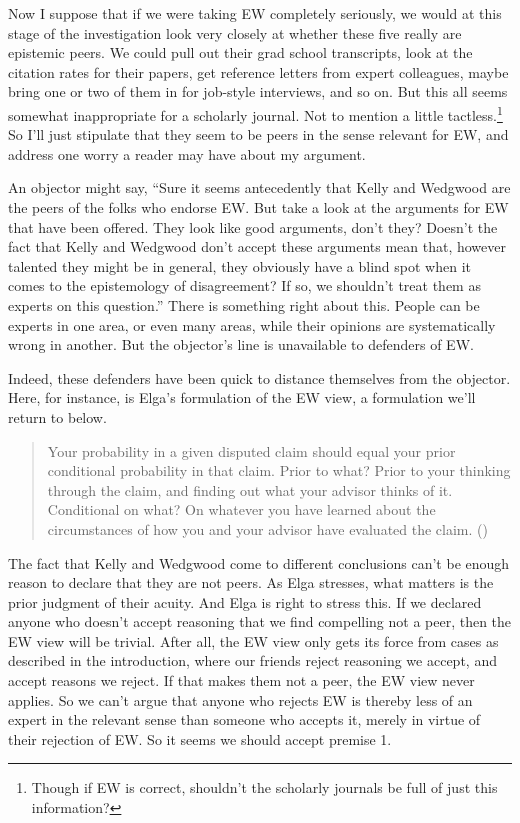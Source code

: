 \documentclass[
  10pt,
  letterpaper,
  DIV=11,
  numbers=noendperiod,
  twoside]{scrartcl}
\begin{document}
Now I suppose that if we were taking EW completely seriously, we would
at this stage of the investigation look very closely at whether these
five really are epistemic peers. We could pull out their grad school
transcripts, look at the citation rates for their papers, get reference
letters from expert colleagues, maybe bring one or two of them in for
job-style interviews, and so on. But this all seems somewhat
inappropriate for a scholarly journal. Not to mention a little
tactless.\footnote{Though if EW is correct, shouldn't the scholarly
  journals be full of just this information?} So I'll just stipulate
that they seem to be peers in the sense relevant for EW, and address one
worry a reader may have about my argument.

An objector might say, ``Sure it seems antecedently that Kelly and
Wedgwood are the peers of the folks who endorse EW. But take a look at
the arguments for EW that have been offered. They look like good
arguments, don't they? Doesn't the fact that Kelly and Wedgwood don't
accept these arguments mean that, however talented they might be in
general, they obviously have a blind spot when it comes to the
epistemology of disagreement? If so, we shouldn't treat them as experts
on this question.'' There is something right about this. People can be
experts in one area, or even many areas, while their opinions are
systematically wrong in another. But the objector's line is unavailable
to defenders of EW.

Indeed, these defenders have been quick to distance themselves from the
objector. Here, for instance, is Elga's formulation of the EW view, a
formulation we'll return to below.

\begin{quote}
Your probability in a given disputed claim should equal your prior
conditional probability in that claim. Prior to what? Prior to your
thinking through the claim, and finding out what your advisor thinks of
it. Conditional on what? On whatever you have learned about the
circumstances of how you and your advisor have evaluated the claim.
()
\end{quote}

The fact that Kelly and Wedgwood come to different conclusions can't be
enough reason to declare that they are not peers. As Elga stresses, what
matters is the prior judgment of their acuity. And Elga is right to
stress this. If we declared anyone who doesn't accept reasoning that we
find compelling not a peer, then the EW view will be trivial. After all,
the EW view only gets its force from cases as described in the
introduction, where our friends reject reasoning we accept, and accept
reasons we reject. If that makes them not a peer, the EW view never
applies. So we can't argue that anyone who rejects EW is thereby less of
an expert in the relevant sense than someone who accepts it, merely in
virtue of their rejection of EW. So it seems we should accept premise 1.
\end{document}
